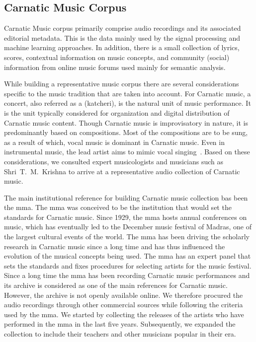 \subsection{Carnatic Music Corpus}
\label{sec:corpus_carnatic_music_corpus}

Carnatic Music corpus primarily comprise audio recordings and its associated editorial metadata. This is the data mainly used by the signal processing and machine learning approaches. In addition, there is a small collection of lyrics, scores, contextual information on music concepts, and community (social) information from online music forums used mainly for semantic analysis. 

While building a representative music corpus there are several considerations specific to the music tradition that are taken into account. For Carnatic music, a concert, also referred as a (\gls{katcheri}), is the natural unit of music performance. It is the unit typically considered for organization and digital distribution of Carnatic music content. Though Carnatic music is improvisatory in nature, it is predominantly based on compositions. Most of the compositions are to be sung, as a result of which, vocal music is dominant in Carnatic music. Even in instrumental music, the lead artist aims to mimic vocal singing~\citep{Viswanathan2004}. Based on these considerations, we consulted expert musicologists and musicians such as Shri~T.~M.~Krishna to arrive at a representative audio collection of Carnatic music.

The main institutional reference for building Carnatic music collection bas been the \gls{mma}. The \Gls{mma} was conceived to be the institution that would set the standards for Carnatic music. Since 1929, the \Gls{mma} hosts annual conferences on music, which has eventually led to the December music festival of Madras, one of the largest cultural events of the world. The \gls{mma} has been driving the scholarly research in Carnatic music since a long time and has thus influenced the evolution of the musical concepts being used. The \gls{mma} has an expert panel that sets the standards and fixes procedures for selecting artists for the music festival. Since a long time the \gls{mma} has been recording Carnatic music performances and its archive is considered as one of the main references for Carnatic music. However, the archive is not openly available online. We therefore procured the audio recordings through other commercial sources while following the criteria used by the \gls{mma}. We started by collecting the releases of the artists who have performed in the \gls{mma} in the last five years. Subsequently, we expanded the collection to include their teachers and other musicians popular in their era. 

